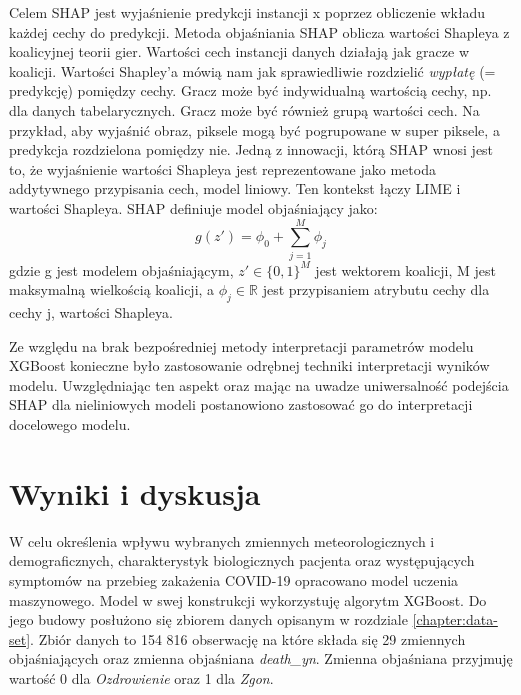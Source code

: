 \documentclass[polish, twoside, 12pt, a4paper]{article}
\theoremstyle{definition}
\theoremstyle{plain}
\theoremstyle{remark}
\begin{document}
Celem SHAP jest wyjaśnienie predykcji instancji x poprzez obliczenie wkładu każdej cechy do predykcji. Metoda objaśniania SHAP oblicza wartości Shapleya z koalicyjnej teorii gier. Wartości cech instancji danych działają jak gracze w koalicji. Wartości Shapley'a mówią nam jak sprawiedliwie rozdzielić \emph{wypłatę} (= predykcję) pomiędzy cechy. Gracz może być indywidualną wartością cechy, np. dla danych tabelarycznych. Gracz może być również grupą wartości cech. Na przykład, aby wyjaśnić obraz, piksele mogą być pogrupowane w super piksele, a predykcja rozdzielona pomiędzy nie. Jedną z innowacji, którą SHAP wnosi jest to, że wyjaśnienie wartości Shapleya jest reprezentowane jako metoda addytywnego przypisania cech, model liniowy. Ten kontekst łączy LIME i wartości Shapleya. SHAP definiuje model objaśniający jako:
\[ g(z') =  \phi_0 + \sum_{j=1}^{M}\phi_j \]
gdzie g jest modelem objaśniającym, \( z'\in\{0,1\}^{M}\)  jest wektorem koalicji, M jest maksymalną wielkością koalicji, a \( \phi_j \in\mathbb{R}\) jest przypisaniem atrybutu cechy dla cechy j, wartości Shapleya. \cite{lundberg2017}

Ze względu na brak bezpośredniej metody interpretacji parametrów modelu XGBoost konieczne było zastosowanie odrębnej techniki interpretacji wyników modelu. Uwzględniając ten aspekt oraz mając na uwadze uniwersalność podejścia SHAP dla nieliniowych modeli postanowiono zastosować go do interpretacji docelowego modelu.


\clearpage
\section{Wyniki i dyskusja}


W celu określenia wpływu wybranych zmiennych meteorologicznych i demograficznych, charakterystyk biologicznych pacjenta oraz występujących symptomów na przebieg zakażenia COVID-19 opracowano model uczenia maszynowego. Model w swej konstrukcji wykorzystuję algorytm XGBoost. Do jego budowy posłużono się zbiorem danych opisanym w rozdziale \ref{chapter:data-set}. Zbiór danych to 154 816 obserwację na które składa się 29 zmiennych objaśniających oraz zmienna objaśniana \emph{death\_yn}. Zmienna objaśniana przyjmuję wartość 0 dla \emph{Ozdrowienie} oraz 1 dla \emph{Zgon}.
\end{document}
